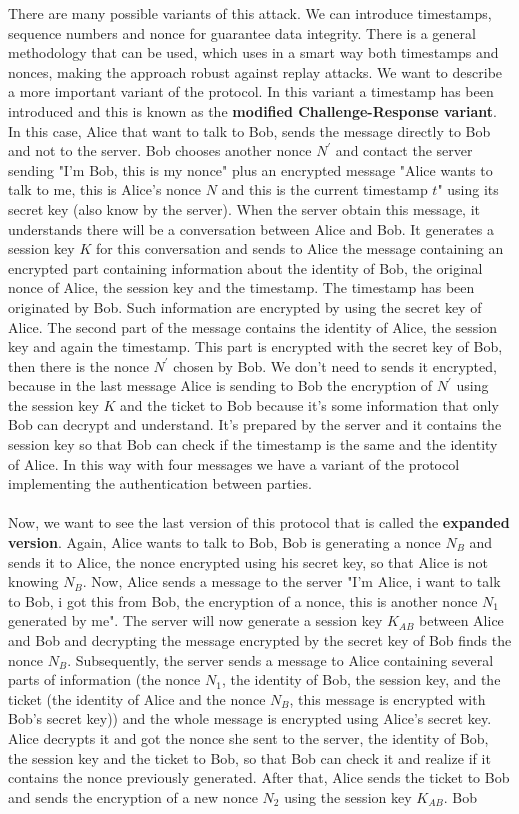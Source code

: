 \documentclass[11pt]{article}
\begin{document}
There are many possible variants of this attack. We can introduce timestamps, sequence numbers and nonce for guarantee data integrity. There is a general methodology that can be used, which uses in a smart way both timestamps and nonces, making the approach robust against replay attacks. We want to describe a more important variant of the protocol. In this variant a timestamp has been introduced and this is known as the \textbf{modified Challenge-Response variant}. In this case, Alice that want to talk to Bob, sends the message directly to Bob and not to the server. Bob chooses another nonce $N^{'}$ and contact the server sending "I'm Bob, this is my nonce" plus an encrypted message "Alice wants to talk to me, this is Alice's nonce $N$ and this is the current timestamp $t$" using its secret key (also know by the server). When the server obtain this message, it understands there will be a conversation between Alice and Bob. It generates a session key $K$ for this conversation and sends to Alice the message containing an encrypted part containing information about the identity of Bob, the original nonce of Alice, the session key and the timestamp. The timestamp has been originated by Bob. Such information are encrypted by using the secret key of Alice. The second part of the message contains the identity of Alice, the session key and again the timestamp. This part is encrypted with the secret key of Bob, then there is the nonce $N^{'}$ chosen by Bob. We don't need to sends it encrypted, because in the last message Alice is sending to Bob the encryption of $N^{'}$ using the session key $K$  and the ticket to Bob because it's some information that only Bob can decrypt and understand. It's prepared by the server and it contains the session key so that Bob can check if the timestamp is the same and the identity of Alice. In this way with four messages we have a variant of the protocol implementing the authentication between parties.\\\\Now, we want to see the last version of this protocol that is called the \textbf{expanded version}. Again, Alice wants to talk to Bob, Bob is generating a nonce $N_B$ and sends it to Alice, the nonce encrypted using his secret key, so that Alice is not knowing $N_B$. Now, Alice sends a message to the server "I'm Alice, i want to talk to Bob, i got this from Bob, the encryption of a nonce, this is another nonce $N_1$ generated by me". The server will now generate a session key $K_{AB}$ between Alice and Bob and decrypting the message encrypted by the secret key of Bob finds the nonce $N_B$. Subsequently, the server sends a message to Alice containing several parts of information (the nonce $N_1$, the identity of Bob, the session key, and the ticket (the identity of Alice and the nonce $N_B$, this message is encrypted with Bob's secret key)) and the whole message is encrypted using Alice's secret key. Alice decrypts it and got the nonce she sent to the server, the identity of Bob, the session key and the ticket to Bob, so that Bob can check it and realize if it contains the nonce previously generated. After that, Alice sends the ticket to Bob and sends the encryption of a new nonce $N_2$ using the session key $K_{AB}$. Bob 
\end{document}
